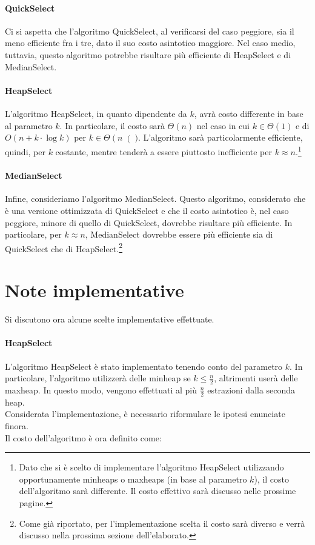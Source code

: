 \documentclass{article}
\begin{document}
	\paragraph{QuickSelect}
	Ci si aspetta che l'algoritmo QuickSelect, al verificarsi del caso peggiore, sia il meno efficiente fra i tre, dato il suo costo asintotico maggiore. Nel caso medio, tuttavia, questo algoritmo potrebbe risultare più efficiente di HeapSelect e di MedianSelect.
	
	\paragraph{HeapSelect}
	L'algoritmo HeapSelect, in quanto dipendente da $k$, avrà costo differente in base al parametro $k$.
	In particolare, il costo sarà $\Theta\left(n\right)$ nel caso in cui $k\in\Theta(1)$ e di $O\left(n + k\cdot\log{k}\right)$ per $k\in\Theta\left(n\right()$. L'algoritmo sarà particolarmente efficiente, quindi, per $k$ costante, mentre tenderà a essere piuttosto inefficiente per $k\approx n$.\footnote{Dato che si è scelto di implementare l'algoritmo HeapSelect utilizzando opportunamente minheaps o maxheaps (in base al parametro $k$), il costo dell'algoritmo sarà differente. Il costo effettivo sarà discusso nelle prossime pagine.}
	
	\paragraph{MedianSelect}
	Infine, consideriamo l'algoritmo MedianSelect. Questo algoritmo, considerato che è una versione ottimizzata di QuickSelect	e che il costo asintotico è, nel caso peggiore, minore di quello di QuickSelect, dovrebbe risultare più efficiente. In particolare, per $k\approx n$, MedianSelect dovrebbe essere più efficiente sia di QuickSelect che di HeapSelect.\footnote{Come già riportato, per l'implementazione scelta il costo sarà diverso e verrà discusso nella prossima sezione dell'elaborato.}
	
	\newpage
	
	\section{Note implementative}
	\label{section:impl_notes}
	Si discutono ora alcune scelte implementative effettuate.
	
	\paragraph{HeapSelect}
	L'algoritmo HeapSelect è stato implementato tenendo conto del parametro $k$. In particolare, l'algoritmo utilizzerà delle minheap se $k\leq \frac{n}{2}$, altrimenti userà delle maxheap. In questo modo, vengono effettuati al più $\frac{n}{2}$ estrazioni dalla seconda heap. \\ Considerata l'implementazione, è necessario riformulare le ipotesi enunciate finora. \\ Il costo dell'algoritmo è ora definito come:
	
\end{document}
